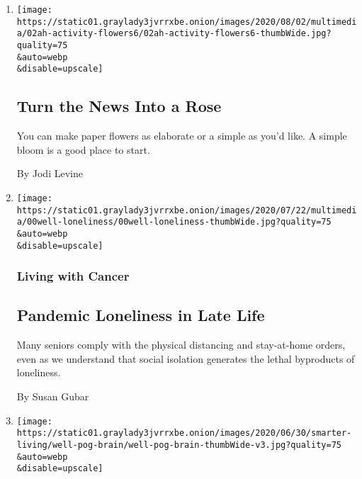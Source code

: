 \begin{enumerate}
\def\labelenumi{\arabic{enumi}.}
\item
  \href{/2020/08/01/at-home/coronavirus-paper-flowers.html}{}

  \texttt{[image: https://static01.graylady3jvrrxbe.onion/images/2020/08/02/multimedia/02ah-activity-flowers6/02ah-activity-flowers6-thumbWide.jpg?quality=75\\\&auto=webp\\\&disable=upscale]}

  \hypertarget{turn-the-news-into-a-rose}{%
  \subsection{Turn the News Into a
  Rose}\label{turn-the-news-into-a-rose}}

  You can make paper flowers as elaborate or a simple as you'd like. A
  simple bloom is a good place to start.

  By Jodi Levine
\item
  \href{/2020/07/30/well/mind/pandemic-loneliness-in-late-life.html}{}

  \texttt{[image: https://static01.graylady3jvrrxbe.onion/images/2020/07/22/multimedia/00well-loneliness/00well-loneliness-thumbWide.jpg?quality=75\\\&auto=webp\\\&disable=upscale]}

  \hypertarget{living-with-cancer}{%
  \subsubsection{Living with Cancer}\label{living-with-cancer}}

  \hypertarget{pandemic-loneliness-in-late-life}{%
  \subsection{Pandemic Loneliness in Late
  Life}\label{pandemic-loneliness-in-late-life}}

  Many seniors comply with the physical distancing and stay-at-home
  orders, even as we understand that social isolation generates the
  lethal byproducts of loneliness.

  By Susan Gubar
\item
  \href{/2020/07/29/well/mind/gum-disease-tied-to-alzheimers-disease-risk.html}{}

  \texttt{[image: https://static01.graylady3jvrrxbe.onion/images/2020/06/30/smarter-living/well-pog-brain/well-pog-brain-thumbWide-v3.jpg?quality=75\\\&auto=webp\\\&disable=upscale]}


\end{enumerate}
